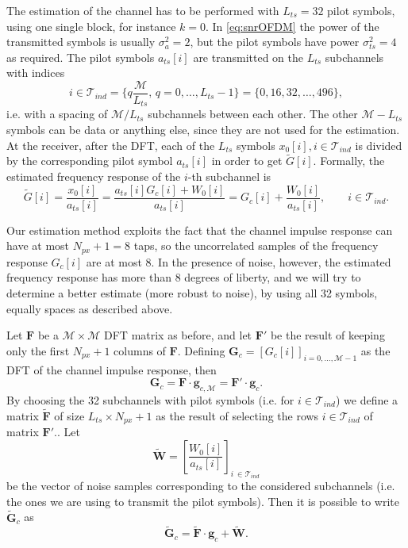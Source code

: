 \documentclass[10pt]{article}
\newcommand{\ofdM} {\mathcal{M}}
\newcommand{\DFTmat} {\mathbf{F}}
\newcommand{\DFTreduced} {\mathbf{\tilde{F}}}
\begin{document}
The estimation of the channel has to be performed with $L_{ts} = 32$ pilot symbols, using one single block, for instance $k=0$. In \eqref{eq:snrOFDM} the power of the transmitted symbols is usually $\sigma_a^2 = 2$, but the pilot symbols have power $\sigma_{ts}^2 = 4$ as required. The pilot symbols $a_{ts}[i]$ are transmitted on the $L_{ts}$ subchannels with indices
\begin{equation}
	i \in \mathcal{T}_{ind} = \{q \frac{\ofdM}{L_{ts}}, \, q = 0,\ldots,L_{ts}-1 \}  = \{ 0, 16, 32, \dots, 496 \},
\end{equation}
i.e. with a spacing of $\ofdM/L_{ts}$ subchannels between each other. The other $\ofdM - L_{ts}$ symbols can be data or anything else, since they are not used for the estimation. At the receiver, after the DFT, each of the $L_{ts}$ symbols $x_0[i], i \in \mathcal{T}_{ind}$ is divided by the corresponding pilot symbol $a_{ts}[i]$ in order to get $\tilde{G}[i]$. Formally, the estimated frequency response of the $i$-th subchannel is
\begin{equation}
	\tilde{G}[i] = \dfrac{x_0[i]}{a_{ts}[i]} = \dfrac{a_{ts}[i] G_c[i] + W_0[i]}{a_{ts}[i]} = G_c[i] + \dfrac{W_0[i]}{a_{ts}[i]}, \qquad i \in \mathcal{T}_{ind}.
\end{equation}

Our estimation method exploits the fact that the channel impulse response can have at most $N_{px} + 1 = 8$ taps, so the uncorrelated samples of the frequency response $G_c[i]$ are at most 8. In the presence of noise, however, the estimated frequency response has more than 8 degrees of liberty, and we will try to determine a better estimate (more robust to noise), by using all 32 symbols, equally spaces as described above.

Let $\DFTmat$ be a $\ofdM \times \ofdM$ DFT matrix as before, and let $\DFTmat'$ be the result of keeping only the first $N_{px}+1$ columns of $\DFTmat$. Defining $\mathbf{G}_c = [ G_c[i] ]_{i = 0,\ldots,\ofdM-1}$ as the DFT of the channel impulse response, then
\begin{equation}
	\mathbf{G}_c = \DFTmat \cdot \mathbf{g}_{c,\ofdM} = \DFTmat' \cdot \mathbf{g}_c.
\end{equation}
By choosing the 32 subchannels with pilot symbols (i.e. for $ i \in \mathcal{T}_{ind}$) we define a matrix $\DFTreduced$ of size $L_{ts} \times N_{px} + 1$ as the result of selecting the rows $ i\in \mathcal{T}_{ind} $ of matrix $\DFTmat'$.. Let 
\begin{equation}
\mathbf{\tilde{W}} = \left[ \dfrac{W_0[i]}{a_{ts}[i]} \right] _{i\ \in \mathcal{T}_{ind}}
\end{equation}
be the vector of noise samples corresponding to the considered subchannels (i.e. the ones we are using to transmit the pilot symbols). Then it is possible to write $\mathbf{\tilde{G}}_c$ as
\begin{equation}
	\mathbf{\tilde{G}}_c = \DFTreduced \cdot \mathbf{g}_{c} + \mathbf{\tilde{W}}.
	\label{eq:OFDMfreqresp}
\end{equation}
\end{document}
